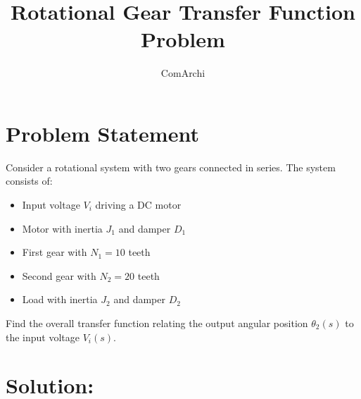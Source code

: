 \documentclass[11pt]{article}
\title{Rotational Gear Transfer Function Problem}
\author{ComArchi}
\date{}
\begin{document}
\maketitle

\section{Problem Statement}

Consider a rotational system with two gears connected in series. The system consists of:
\begin{itemize}
    \item Input voltage $V_i$ driving a DC motor
    \item Motor with inertia $J_1$ and damper $D_1$
    \item First gear with $N_1 = 10$ teeth
    \item Second gear with $N_2 = 20$ teeth  
    \item Load with inertia $J_2$ and damper $D_2$
\end{itemize}

Find the overall transfer function relating the output angular position $\theta_2(s)$ to the input voltage $V_i(s)$.

\section{Solution:}
\end{document}

